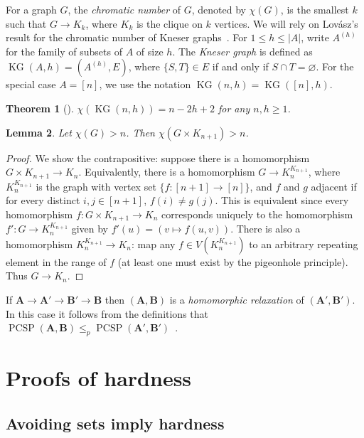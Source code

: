 \documentclass[a4paper,11pt]{article}
\renewcommand\emptyset\varnothing
\newcommand{\2}{\vec{2}}
\newcommand{\1}{\vec{1}}
\newcommand{\0}{\vec{0}}
\renewcommand{\A}{\ensuremath{\mathbf{A}}}
\newcommand{\B}{\ensuremath{\mathbf{B}}}
\newcommand{\KK}{\ensuremath{K}}
\DeclareMathOperator{\KG}{KG}
\DeclareMathOperator{\PCSP}{PCSP}
\theoremstyle{plain}
\newtheorem{theorem}{Theorem}
\newtheorem{lemma}[theorem]{Lemma}
\theoremstyle{definition}
\begin{document}
For a graph $G$, the \emph{chromatic number} of $G$, denoted by $\chi(G)$, is the smallest $k$ such
that $G\to \KK_k$, where $\KK_k$ is the clique on $k$
vertices.
We will rely on Lov\'asz's result for the chromatic number of Kneser graphs~\cite{Lovasz78}.
For $1\leq h \leq |A|$, write $A^{(h)}$ for the family of subsets of $A$ of size $h$.
The \emph{Kneser graph} is defined as 
$\KG(A,h) = (A^{(h)},E)$,
where $\{S,T\} \in E$ if and only if $S\cap T = \emptyset$. For the special case $A = [n]$, we use the notation $\KG(n, h) = \KG([n], h)$.

\begin{theorem}[\cite{Lovasz78}]\label{kneserchrombound}
  $\chi(\KG(n,h))=n-2h+2$ for any $n,h\geq 1$.
\end{theorem}
\begin{lemma}\label{prodchrombound}
	Let $\chi(G) > n$. Then $\chi(G \times \KK_{n+1}) > n$.
\end{lemma}
\begin{proof}
	We show the contrapositive: suppose there is a homomorphism $G \times \KK_{n+1} \to \KK_n$.
	Equivalently, there is a homomorphism $G \to \KK_n^{\KK_{n+1}}$, where $\KK_n^{\KK_{n+1}}$ is the graph with vertex set $\{f:[n+1]\to[n]\}$, and $f$ and $g$ adjacent if for every distinct $i,j \in [n+1]$, $f(i) \neq g(j)$. This is equivalent since every homomorphism 
    $f : G \times \KK_{n + 1} \to \KK_n$
     corresponds uniquely to the homomorphism $f' : G \to \KK_n^{\KK_{n + 1}}$ given by $f'(u) = (v \mapsto f(u, v))$.
    There is also a homomorphism $\KK_n^{\KK_{n+1}} \to \KK_n$: map any $f \in V(\KK_n^{\KK_{n+1}})$ to an arbitrary repeating element in the range of $f$ (at least one must exist by the pigeonhole principle). Thus $G \to \KK_n$.
\end{proof}

If $\A\to\A'\to\B'\to\B$ then $(\A,\B)$ is a \emph{homomorphic relaxation} of $(\A',\B')$. In this case it follows from the definitions that  $\PCSP(\A,\B)\leq_p\PCSP(\A',\B')$~\cite{BBKO21}.









 
\section{Proofs of hardness}
\subsection{Avoiding sets imply hardness}
\label{sec:avoiding}
\end{document}
